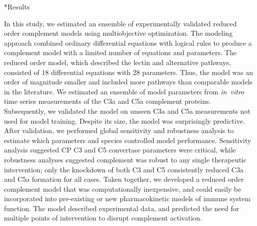 \documentclass[12pt]{article}
\makeatletter
\renewcommand\section{\@startsection
	{subsection}{2}{0mm}
	{-0.2in}
	{0.05\baselineskip}
	{\normalfont\large\bfseries}}
\makeatother
\begin{document}
\clearpage

\section*{Results}

In this study, we estimated an ensemble of experimentally validated reduced order complement models using multiobjective optimization.
The modeling approach combined ordinary differential equations with logical rules to produce a complement model with a limited number of equations and parameters.
The reduced order model,  which described the lectin and alternative pathways, consisted of 18 differential equations with 28 parameters.
Thus, the model was an order of magnitude smaller and included more pathways than comparable models in the literature.
We estimated an ensemble of model parameters from \textit{in~vitro} time series measurements of the C3a and C5a complement proteins.
Subsequently, we validated the model on unseen C3a and C5a measurements not used for model training.
Despite its size, the model was surprisingly predictive.
After validation, we performed global sensitivity and robustness analysis to estimate which parameters and species
controlled model performance. Sensitivity analysis suggested CP C3 and C5 convertase parameters were critical,
while robustness analyses suggested complement was robust to any single therapeutic intervention;
only the knockdown of both C3 and C5 consistently reduced C3a and C5a formation for all cases.
Taken together, we developed a reduced order complement model that was computationally inexpensive,
and could easily be incorporated into pre-existing or new pharmacokinetic models of immune system function.
The model described experimental data, and predicted the need for multiple points of intervention to disrupt complement activation.
\end{document}
